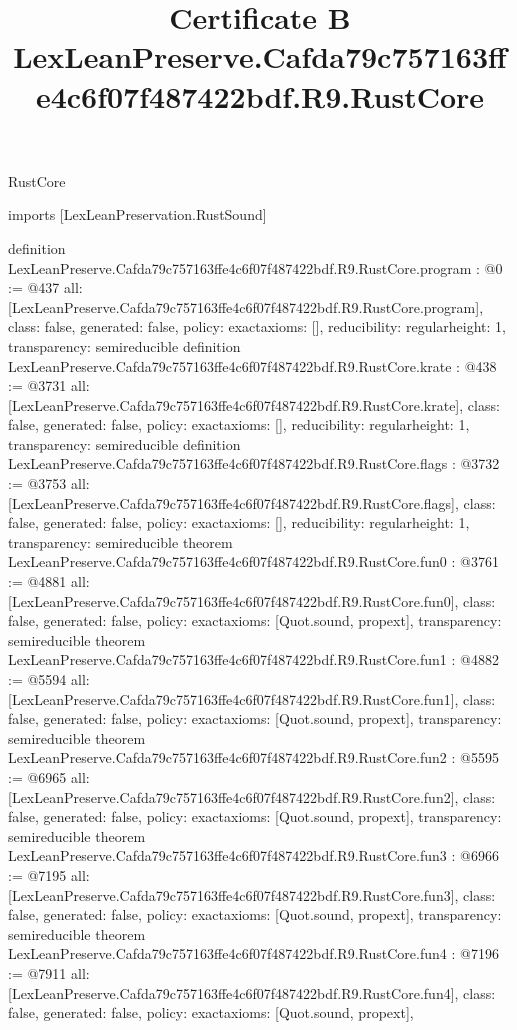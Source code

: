 \begin{lexlean}{RustCore}
\title{Certificate B LexLeanPreserve.Cafda79c757163ffe4c6f07f487422bdf.R9.RustCore}
\begin{coremodule}
imports [LexLeanPreservation.RustSound]

definition LexLeanPreserve.Cafda79c757163ffe4c6f07f487422bdf.R9.RustCore.program : @0 := @437 {
  all: [LexLeanPreserve.Cafda79c757163ffe4c6f07f487422bdf.R9.RustCore.program],
  class: false,
  generated: false,
  policy: exact{axioms: []},
  reducibility: regular{height: 1},
  transparency: semireducible
}
definition LexLeanPreserve.Cafda79c757163ffe4c6f07f487422bdf.R9.RustCore.krate : @438 := @3731 {
  all: [LexLeanPreserve.Cafda79c757163ffe4c6f07f487422bdf.R9.RustCore.krate],
  class: false,
  generated: false,
  policy: exact{axioms: []},
  reducibility: regular{height: 1},
  transparency: semireducible
}
definition LexLeanPreserve.Cafda79c757163ffe4c6f07f487422bdf.R9.RustCore.flags : @3732 := @3753 {
  all: [LexLeanPreserve.Cafda79c757163ffe4c6f07f487422bdf.R9.RustCore.flags],
  class: false,
  generated: false,
  policy: exact{axioms: []},
  reducibility: regular{height: 1},
  transparency: semireducible
}
theorem LexLeanPreserve.Cafda79c757163ffe4c6f07f487422bdf.R9.RustCore.fun0 : @3761 := @4881 {
  all: [LexLeanPreserve.Cafda79c757163ffe4c6f07f487422bdf.R9.RustCore.fun0],
  class: false,
  generated: false,
  policy: exact{axioms: [Quot.sound, propext]},
  transparency: semireducible
}
theorem LexLeanPreserve.Cafda79c757163ffe4c6f07f487422bdf.R9.RustCore.fun1 : @4882 := @5594 {
  all: [LexLeanPreserve.Cafda79c757163ffe4c6f07f487422bdf.R9.RustCore.fun1],
  class: false,
  generated: false,
  policy: exact{axioms: [Quot.sound, propext]},
  transparency: semireducible
}
theorem LexLeanPreserve.Cafda79c757163ffe4c6f07f487422bdf.R9.RustCore.fun2 : @5595 := @6965 {
  all: [LexLeanPreserve.Cafda79c757163ffe4c6f07f487422bdf.R9.RustCore.fun2],
  class: false,
  generated: false,
  policy: exact{axioms: [Quot.sound, propext]},
  transparency: semireducible
}
theorem LexLeanPreserve.Cafda79c757163ffe4c6f07f487422bdf.R9.RustCore.fun3 : @6966 := @7195 {
  all: [LexLeanPreserve.Cafda79c757163ffe4c6f07f487422bdf.R9.RustCore.fun3],
  class: false,
  generated: false,
  policy: exact{axioms: [Quot.sound, propext]},
  transparency: semireducible
}
theorem LexLeanPreserve.Cafda79c757163ffe4c6f07f487422bdf.R9.RustCore.fun4 : @7196 := @7911 {
  all: [LexLeanPreserve.Cafda79c757163ffe4c6f07f487422bdf.R9.RustCore.fun4],
  class: false,
  generated: false,
  policy: exact{axioms: [Quot.sound, propext]},
}
\end{coremodule}
\end{lexlean}
